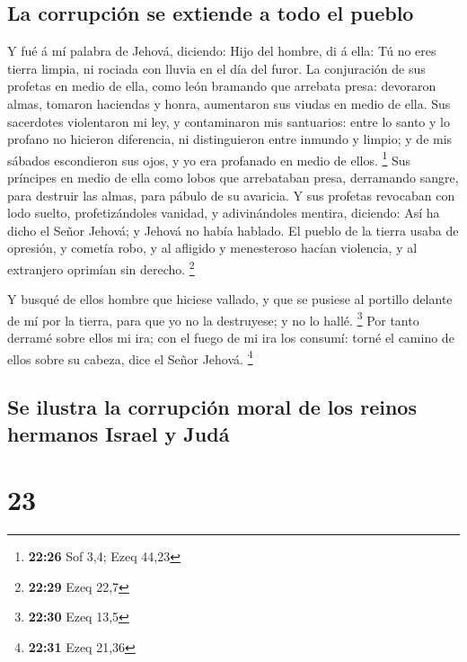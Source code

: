 \hypertarget{la-corrupciuxf3n-se-extiende-a-todo-el-pueblo}{%
\subsection{La corrupción se extiende a todo el
pueblo}\label{la-corrupciuxf3n-se-extiende-a-todo-el-pueblo}}

 Y fué á mí palabra de Jehová, diciendo: 
Hijo del hombre, di á ella: Tú no eres tierra limpia, ni rociada con
lluvia en el día del furor.  La conjuración de sus
profetas en medio de ella, como león bramando que arrebata presa:
devoraron almas, tomaron haciendas y honra, aumentaron sus viudas en
medio de ella.  Sus sacerdotes violentaron mi ley, y
contaminaron mis santuarios: entre lo santo y lo profano no hicieron
diferencia, ni distinguieron entre inmundo y limpio; y de mis sábados
escondieron sus ojos, y yo era profanado en medio de ellos. \footnote{\textbf{22:26}
  Sof 3,4; Ezeq 44,23}  Sus príncipes en medio de ella
como lobos que arrebataban presa, derramando sangre, para destruir las
almas, para pábulo de su avaricia.  Y sus profetas
revocaban con lodo suelto, profetizándoles vanidad, y adivinándoles
mentira, diciendo: Así ha dicho el Señor Jehová; y Jehová no había
hablado.  El pueblo de la tierra usaba de opresión, y
cometía robo, y al afligido y menesteroso hacían violencia, y al
extranjero oprimían sin derecho. \footnote{\textbf{22:29} Ezeq 22,7}

 Y busqué de ellos hombre que hiciese vallado, y que se
pusiese al portillo delante de mí por la tierra, para que yo no la
destruyese; y no lo hallé. \footnote{\textbf{22:30} Ezeq 13,5}
 Por tanto derramé sobre ellos mi ira; con el fuego de mi
ira los consumí: torné el camino de ellos sobre su cabeza, dice el Señor
Jehová. \footnote{\textbf{22:31} Ezeq 21,36}

\hypertarget{se-ilustra-la-corrupciuxf3n-moral-de-los-reinos-hermanos-israel-y-juduxe1}{%
\subsection{Se ilustra la corrupción moral de los reinos hermanos Israel
y
Judá}\label{se-ilustra-la-corrupciuxf3n-moral-de-los-reinos-hermanos-israel-y-juduxe1}}

\hypertarget{section-22}{%
\section{23}\label{section-22}}

